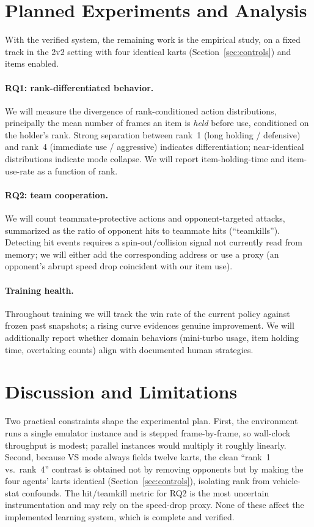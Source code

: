 \documentclass{article}
\begin{document}
\section{Planned Experiments and Analysis}
\label{sec:plan}

With the verified system, the remaining work is the empirical study, on a fixed
track in the 2v2 setting with four identical karts (Section~\ref{sec:controls})
and items enabled.

\paragraph{RQ1: rank-differentiated behavior.} We will measure the divergence of
rank-conditioned action distributions, principally the mean number of frames an
item is \emph{held} before use, conditioned on the holder's rank. Strong
separation between rank~1 (long holding / defensive) and rank~4 (immediate use /
aggressive) indicates differentiation; near-identical distributions indicate mode
collapse. We will report item-holding-time and item-use-rate as a function of
rank.

\paragraph{RQ2: team cooperation.} We will count teammate-protective actions and
opponent-targeted attacks, summarized as the ratio of opponent hits to
teammate hits (``teamkills''). Detecting hit events requires a spin-out/collision
signal not currently read from memory; we will either add the corresponding
address or use a proxy (an opponent's abrupt speed drop coincident with our item
use).

\paragraph{Training health.} Throughout training we will track the win rate of
the current policy against frozen past snapshots; a rising curve evidences genuine
improvement. We will additionally report whether domain behaviors (mini-turbo
usage, item holding time, overtaking counts) align with documented human
strategies.


\section{Discussion and Limitations}

Two practical constraints shape the experimental plan. First, the environment
runs a single emulator instance and is stepped frame-by-frame, so wall-clock
throughput is modest; parallel instances would multiply it roughly linearly.
Second, because VS mode always fields twelve karts, the clean ``rank~1 vs.\
rank~4'' contrast is obtained not by removing opponents but by making the four
agents' karts identical (Section~\ref{sec:controls}), isolating rank from
vehicle-stat confounds. The hit/teamkill metric for RQ2 is the most uncertain
instrumentation and may rely on the speed-drop proxy. None of these
affect the implemented learning system, which is complete and verified.
\end{document}
